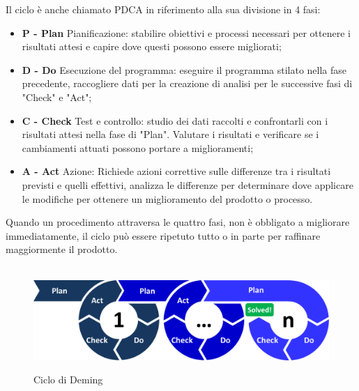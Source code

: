 \documentclass[../norme-di-progetto.tex]{subfiles}
\begin{document}
Il ciclo è anche chiamato PDCA in riferimento alla sua divisione in 4 fasi:
\begin{itemize}
    \item \textbf{P - Plan} Pianificazione: stabilire obiettivi e processi necessari per ottenere i risultati attesi e capire dove questi possono essere migliorati;
    \item \textbf{D - Do} Esecuzione del programma: eseguire il programma stilato nella fase precedente, raccogliere dati per la creazione di analisi per le successive fasi di "Check" e "Act";
    \item \textbf{C - Check} Test e controllo: studio dei dati raccolti e confrontarli con i risultati attesi nella fase di "Plan". Valutare i risultati e verificare se i cambiamenti attuati possono portare a miglioramenti;
    \item \textbf{A - Act} Azione: Richiede azioni correttive sulle differenze tra i risultati previsti e quelli effettivi, analizza le differenze per determinare dove applicare le modifiche per ottenere un miglioramento del prodotto o processo.
\end{itemize}
Quando un procedimento attraversa le quattro fasi, non è obbligato a migliorare immediatamente, il ciclo può essere ripetuto tutto o in parte per raffinare maggiormente il prodotto.
\\ \\
\begin{figure}[H]
    \centering
    \includegraphics[width=15cm]{img/ciclo_di_deming.png}
    \label{fig:ciclo_di_deming}
    \caption{Ciclo di Deming}
\end{figure}
\end{document}
